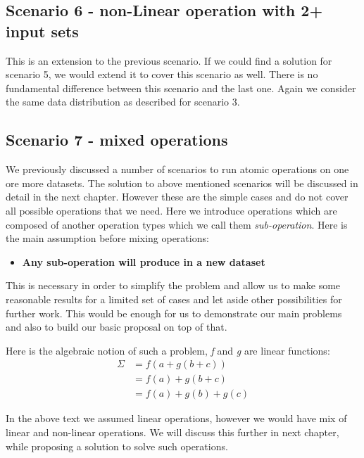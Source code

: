 \subsection{Scenario 6 - non-Linear operation with 2+ input sets}
This is an extension to the previous scenario. 
If we could find a solution for scenario 5, we would extend it to cover this scenario as well. 
There is no fundamental difference between this scenario and the last one. Again we consider the same
data distribution as described for scenario 3.

\subsection{Scenario 7 - mixed operations}
We previously discussed a number of scenarios to run atomic operations on one ore more datasets. The solution to 
above mentioned scenarios will be discussed in detail in the next chapter. However these are the simple cases and
do not cover all possible operations that we need. Here we introduce operations which are composed of another
operation types which we call them \textit{sub-operation}.
Here is the main assumption before mixing operations:

\begin{itemize}
\item \textbf{Any sub-operation will produce in a new dataset}
\end{itemize}

This is necessary in order to simplify the problem and allow us to make some reasonable results
for a limited set of cases and let aside other possibilities for further work. This would be enough
for us to demonstrate our main problems and also to build our basic proposal on top of that.

Here is the algebraic notion of such a problem, \textit{f} and \textit{g} are linear functions:
\begin{subequations}
\begin{align*}
\Sigma &= f(a + g(b + c))\\
&= f(a) + g(b + c)\\
&= f(a) + g(b) + g(c)
\end{align*}
\end{subequations}

In the above text we assumed linear operations, however we would have mix of linear and non-linear operations. 
We will discuss this further in next chapter, while proposing a solution to solve such operations.

